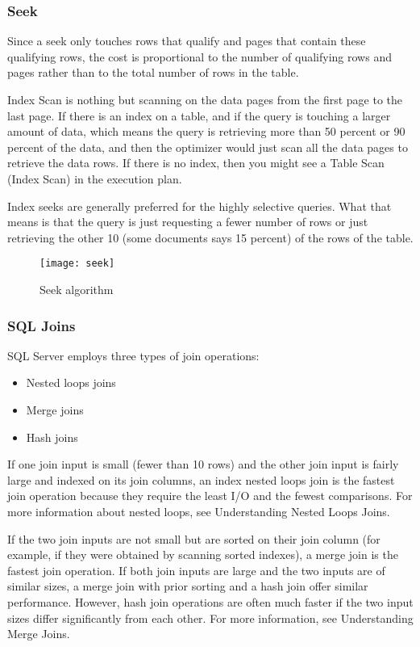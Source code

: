 \subsubsection{Seek}
Since a seek only touches rows that qualify and pages that contain these qualifying rows, the cost is proportional to the number of qualifying rows and pages rather than to the total number of rows in the table.

Index Scan is nothing but scanning on the data pages from the first page to the last page. If there is an index on a table, and if the query is touching a larger amount of data, which means the query is retrieving more than 50 percent or 90 percent of the data, and then the optimizer would just scan all the data pages to retrieve the data rows. If there is no index, then you might see a Table Scan (Index Scan) in the execution plan.

Index seeks are generally preferred for the highly selective queries. What that means is that the query is just requesting a fewer number of rows or just retrieving the other 10 (some documents says 15 percent) of the rows of the table.
\begin{figure}[ht!]
	\centering
	\texttt{[image: seek]}
	\caption{Seek algorithm}
\end{figure}

\subsubsection{SQL Joins \cite{SQLJoins}}
SQL Server employs three types of join operations:

\begin{itemize}	
	\item Nested loops joins
	\item Merge joins
	\item Hash joins
\end{itemize}

If one join input is small (fewer than 10 rows) and the other join input is fairly large and indexed on its join columns, an index nested loops join is the fastest join operation because they require the least I/O and the fewest comparisons. For more information about nested loops, see Understanding Nested Loops Joins.

If the two join inputs are not small but are sorted on their join column (for example, if they were obtained by scanning sorted indexes), a merge join is the fastest join operation. If both join inputs are large and the two inputs are of similar sizes, a merge join with prior sorting and a hash join offer similar performance. However, hash join operations are often much faster if the two input sizes differ significantly from each other. For more information, see Understanding Merge Joins.


